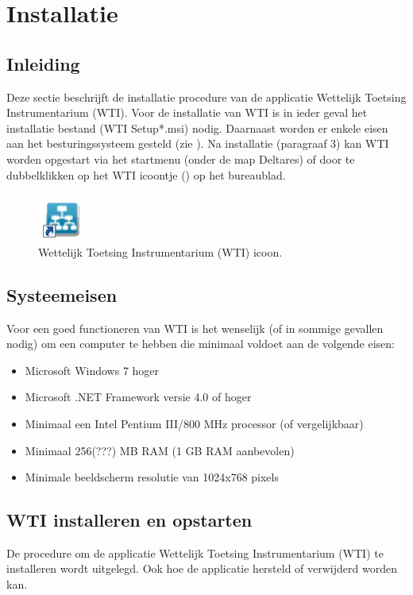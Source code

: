 
\chapter{Installatie\label{chap:install}}

\section{Inleiding}
Deze sectie beschrijft de installatie procedure van de applicatie Wettelijk Toetsing Instrumentarium (WTI). Voor de installatie van WTI is in ieder geval het installatie bestand (WTI Setup*.msi) nodig. Daarnaast worden er enkele eisen aan het besturingssysteem gesteld (zie ). Na installatie (paragraaf 3) kan WTI worden opgestart via het startmenu (onder de map Deltares) of door te dubbelklikken op het WTI icoontje () op het bureaublad. 


\begin{figure} [H]
	\centering
		\includegraphics{Figures/Chapter_installation/wti_desktop_icon}
	\caption{Wettelijk Toetsing Instrumentarium (WTI) icoon.}
	\label{fig:fig2.1}
\end{figure}


\section{Systeemeisen}
\label{sec:sysrequirements}
Voor een goed functioneren van WTI is het wenselijk (of in sommige gevallen nodig) om een computer te hebben die minimaal voldoet aan de volgende eisen:
\begin{itemize}
	\item Microsoft Windows 7 hoger
	\item Microsoft .NET Framework versie 4.0 of hoger
	\item Minimaal een Intel Pentium III/800 MHz processor (of vergelijkbaar)
	\item Minimaal 256(???) MB RAM (1 GB RAM aanbevolen)
	\item Minimale beeldscherm resolutie van 1024x768 pixels
\end{itemize}




\section{WTI installeren en opstarten}
De procedure om de applicatie Wettelijk Toetsing Instrumentarium (WTI) te installeren wordt uitgelegd. Ook hoe de applicatie hersteld of verwijderd worden kan.


